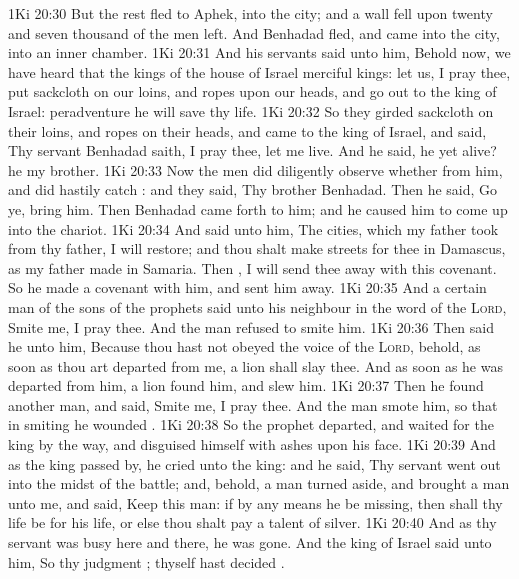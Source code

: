 \vs 1Ki 20:30 But the rest fled to Aphek, into the city; and  a wall fell upon twenty and seven thousand of the men  left. And Benhadad fled, and came into the city, into an inner chamber.
\vs 1Ki 20:31 And his servants said unto him, Behold now, we have heard that the kings of the house of Israel  merciful kings: let us, I pray thee, put sackcloth on our loins, and ropes upon our heads, and go out to the king of Israel: peradventure he will save thy life.
\vs 1Ki 20:32 So they girded sackcloth on their loins, and  ropes on their heads, and came to the king of Israel, and said, Thy servant Benhadad saith, I pray thee, let me live. And he said,  he yet alive? he  my brother.
\vs 1Ki 20:33 Now the men did diligently observe whether  from him, and did hastily catch : and they said, Thy brother Benhadad. Then he said, Go ye, bring him. Then Benhadad came forth to him; and he caused him to come up into the chariot.
\vs 1Ki 20:34 And  said unto him, The cities, which my father took from thy father, I will restore; and thou shalt make streets for thee in Damascus, as my father made in Samaria. Then , I will send thee away with this covenant. So he made a covenant with him, and sent him away.
\vs 1Ki 20:35 And a certain man of the sons of the prophets said unto his neighbour in the word of the \textsc{Lord}, Smite me, I pray thee. And the man refused to smite him.
\vs 1Ki 20:36 Then said he unto him, Because thou hast not obeyed the voice of the \textsc{Lord}, behold, as soon as thou art departed from me, a lion shall slay thee. And as soon as he was departed from him, a lion found him, and slew him.
\vs 1Ki 20:37 Then he found another man, and said, Smite me, I pray thee. And the man smote him, so that in smiting he wounded .
\vs 1Ki 20:38 So the prophet departed, and waited for the king by the way, and disguised himself with ashes upon his face.
\vs 1Ki 20:39 And as the king passed by, he cried unto the king: and he said, Thy servant went out into the midst of the battle; and, behold, a man turned aside, and brought a man unto me, and said, Keep this man: if by any means he be missing, then shall thy life be for his life, or else thou shalt pay a talent of silver.
\vs 1Ki 20:40 And as thy servant was busy here and there, he was gone. And the king of Israel said unto him, So  thy judgment ; thyself hast decided .
